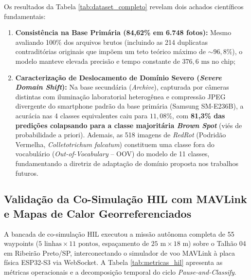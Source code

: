 \documentclass[12pt]{article}
\begin{document}
Os resultados da Tabela \ref{tab:dataset_completo} revelam dois achados científicos fundamentais:
\begin{enumerate}
    \item \textbf{Consistência na Base Primária (84,62\% em 6.748 fotos):} Mesmo avaliando 100\% dos arquivos brutos (incluindo as 214 duplicatas contraditórias originais que impõem um teto teórico máximo de $\sim 96,8\%$), o modelo manteve elevada precisão e tempo constante de $376,6\text{ ms}$ no chip;
    \item \textbf{Caracterização de Deslocamento de Domínio Severo (\textit{Severe Domain Shift}):} Na base secundária (\textit{Archive}), capturada por câmeras distintas com iluminação laboratorial heterogênea e compressão JPEG divergente do smartphone padrão da base primária (Samsung SM-E236B), a acurácia nas 4 classes equivalentes caiu para $11,08\%$, com \textbf{81,3\% das predições colapsando para a classe majoritária \textit{Brown Spot}} (viés de probabilidade a priori). Ademais, as 518 imagens de \textit{RedRot} (Podridão Vermelha, \textit{Colletotrichum falcatum}) constituem uma classe fora do vocabulário (\textit{Out-of-Vocabulary} -- OOV) do modelo de 11 classes, fundamentando a diretriz de adaptação de domínio proposta nos trabalhos futuros.
\end{enumerate}

\subsection{Validação da Co-Simulação HIL com MAVLink e Mapas de Calor Georreferenciados}

A bancada de co-simulação HIL executou a missão autônoma completa de 55 waypoints ($5\text{ linhas} \times 11\text{ pontos}$, espaçamento de $25\text{ m} \times 18\text{ m}$) sobre o Talhão 04 em Ribeirão Preto/SP, interconectando o simulador de voo MAVLink à placa física ESP32-S3 via WebSocket. A Tabela \ref{tab:metricas_hil} apresenta as métricas operacionais e a decomposição temporal do ciclo \textit{Pause-and-Classify}.
\end{document}
